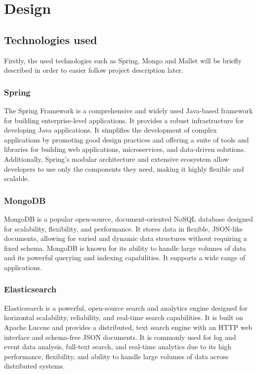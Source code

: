 \section{Design}

\label{ch:design}

\subsection{Technologies used}
Firstly, the used technologies such as Spring, Mongo and Mallet will be briefly described in order
to easier follow project description later.
\subsubsection{Spring}
The Spring Framework is a comprehensive and widely used Java-based framework for building
enterprise-level applications. It provides a robust infrastructure for developing Java applications.
It simplifies the development of complex applications by promoting good design practices and
offering a suite of tools and libraries for building web applications, microservices, and
data-driven solutions. Additionally, Spring's modular architecture and extensive ecosystem
allow developers to use only the components they need, making it highly flexible and scalable.
\cite{spring}

\subsubsection{MongoDB}
MongoDB is a popular open-source, document-oriented NoSQL database designed for scalability,
flexibility, and performance. It stores data in flexible, JSON-like documents, allowing for varied
and dynamic data structures without requiring a fixed schema. MongoDB is known for its ability to handle large
volumes of data and its powerful querying and indexing capabilities. It supports a wide range of applications.
\cite{mongodb}

\subsubsection{Elasticsearch}
Elasticsearch is a powerful, open-source search and analytics engine designed for horizontal scalability,
reliability, and real-time search capabilities. It is built on Apache Lucene and provides a distributed, text
search engine with an HTTP web interface and schema-free JSON documents. It is commonly used for log and event
data analysis, full-text search, and real-time analytics due to its high performance, flexibility, and ability
to handle large volumes of data across distributed systems. \cite{elastic}

